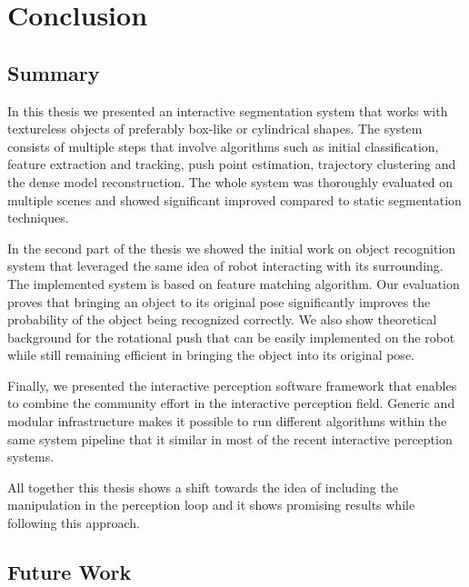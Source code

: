 \chapter{Conclusion}
\label{chapter:conclusion}

\section{Summary}

In this thesis we presented an interactive segmentation system that works with textureless objects of preferably box-like or cylindrical shapes. The system consists of multiple steps that involve algorithms such as initial classification, feature extraction and tracking, push point estimation, trajectory clustering and the dense model reconstruction. The whole system was thoroughly evaluated on multiple scenes and showed significant improved compared to static segmentation techniques.

In the second part of the thesis we showed the initial work on object recognition system that leveraged the same idea of robot interacting with its surrounding. The implemented system is based on feature matching algorithm. Our evaluation proves that bringing an object to its original pose significantly improves the probability of the object being recognized correctly. We also show theoretical background for the rotational push that can be easily implemented on the robot while still remaining efficient in bringing the object into its original pose. 

Finally, we presented the interactive perception software framework that enables to combine the community effort in the interactive perception field. Generic and modular infrastructure makes it possible to run different algorithms within the same system pipeline that it similar in most of the recent interactive perception systems.

All together this thesis shows a shift towards the idea of including the manipulation in the perception loop and it shows promising results while following this approach. 


\section{Future Work}


